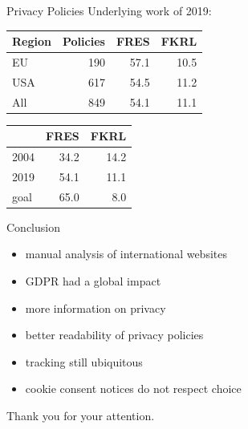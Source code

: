 \documentclass[xcolor={dvipsnames}]{beamer}
\begin{document}
\begin{frame}{Privacy Policies}
    Underlying work of 2019:\\
    \vspace{.5em}
    \centering
    \begin{tabular}{ l r r r }
        \hline
        Region & Policies & FRES & FKRL \\
        \hline
        EU & 190 & 57.1 & 10.5 \\
        USA & 617 & 54.5 & 11.2 \\
        All & 849 & 54.1 & 11.1 \\
        \hline
    \end{tabular}

    \vspace{1em}

    \begin{tabular}{ l r r }
        \hline
        & FRES & FKRL \\
        \hline
        2004 & 34.2 & 14.2 \\
        2019 & 54.1 & 11.1 \\
        goal & 65.0 & 8.0 \\
        \hline
    \end{tabular}
\end{frame}

%

\begin{frame}{Conclusion}
    \begin{itemize}
        \item manual analysis of international websites
        \item GDPR had a global impact
        \item more information on privacy
        \item better readability of privacy policies
        \item tracking still ubiquitous
        \item cookie consent notices do not respect choice
    \end{itemize}
    \pause
    \centering
    \LARGE
    Thank you for your attention.
\end{frame}
\end{document}
